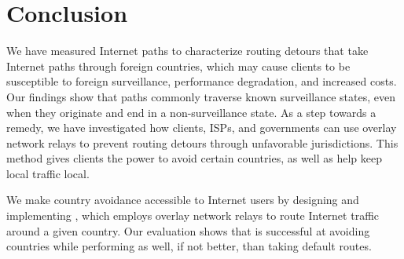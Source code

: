 \section{Conclusion}
\label{conclusion}

We have measured Internet paths to characterize routing
detours that take Internet paths through foreign countries, which may 
cause clients to be susceptible to foreign surveillance, performance 
degradation, and increased costs.  Our findings show that paths commonly traverse known
surveillance states, even when they originate and end in a
non-surveillance state.  As a step towards a remedy, we have
investigated how clients, ISPs, and governments can use overlay network relays to prevent routing detours through
unfavorable jurisdictions.  This method gives clients the power to
avoid certain countries, as well as help keep local traffic local.

We make country avoidance accessible to Internet users by designing 
and implementing \system{}, which employs overlay network relays to 
route Internet traffic around a given country.  Our evaluation shows 
that \system{} is successful at avoiding countries while performing 
as well, if not better, than taking default routes.

